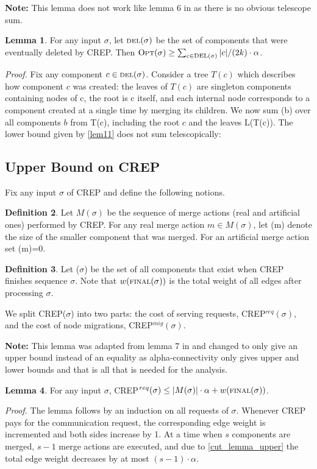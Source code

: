 \documentclass[xcolor=dvipsnames, tikz, 12pt]{article}
\newcommand{\nl}{\newline}
\newcommand{\crep}{C{\scriptsize REP}}
\newcommand{\size}{\text{\scriptsize SIZE}}
\newcommand{\del}{\text{\scriptsize DEL}}
\newcommand{\final}{\text{\scriptsize FINAL}}
\newcommand{\opt}{\text{O{\scriptsize PT}}}
\theoremstyle{definition}
\newtheorem{defi}{Definition}
\newtheorem{lemma}[defi]{Lemma}
\begin{document}
\textbf{Note:} This lemma does not work like lemma 6 in \cite{Avin2015} as there is no obvious telescope sum.
	\begin{lemma}
		For any input $\sigma$, let $\del(\sigma)$ be the set of components that were eventually deleted by \crep{}. Then $\opt(\sigma)\geq\sum_{c\in\del(\sigma)}|c|/(2k)\cdot\alpha$.
	\end{lemma}
	\textit{Proof.} Fix any component $c\in\del(\sigma)$. Consider a tree $T(c)$ which describes how component $c$ was created: the leaves of $T(c)$ are singleton components containing nodes of c, the root is c itself, and each internal node corresponds to a component created at a single time by merging its children.
	We now sum \opt(b) over all components $b$ from T(c), including the root $c$ and the leaves L(T(c)).
	The lower bound given by \cref{lem11} does not sum telescopically:


	\subsection{Upper Bound on \crep{}}
	Fix any input $\sigma$ of \crep{} and define the following notions.
	\begin{defi}
		Let $M(\sigma)$ be the sequence of merge actions (real and artificial ones) performed by \crep{}. For any real merge action $m\in M(\sigma)$, let \size(m) denote the size of the smaller component that was merged. For an artificial merge action set \size(m)=0.
	\end{defi}

\begin{defi}
	Let \final($\sigma$) be the set of all components that exist when \crep{} finishes sequence $\sigma$. Note that $w(\final(\sigma))$ is the total weight of all edges after processing $\sigma$.
\end{defi}

We split \crep{}($\sigma$) into two parts: the cost of serving requests, \crep{}$^{req}(\sigma)$, and the cost of node migrations, \crep{}$^{mig}(\sigma)$.\nl


\textbf{Note:} This lemma was adapted from lemma 7 in \cite{Avin2015} and changed to only give an upper bound instead of an equality as alpha-connectivity only gives upper and lower bounds and that is all that is needed for the analysis.
\begin{lemma}
	For any input $\sigma$, \crep{}$^{req}(\sigma)\leq|M(\sigma)|\cdot\alpha+w(\final(\sigma))$.
\end{lemma}
\textit{Proof.} The lemma follows by an induction on all requests of $\sigma$. Whenever \crep{} pays for the communication request, the corresponding edge weight is incremented and both sides increase by 1.
At a time when $s$ components are merged, $s-1$ merge actions are executed, and due to \cref{cut_lemma_upper} the total edge weight decreases by at most $(s-1)\cdot\alpha$.
\end{document}
